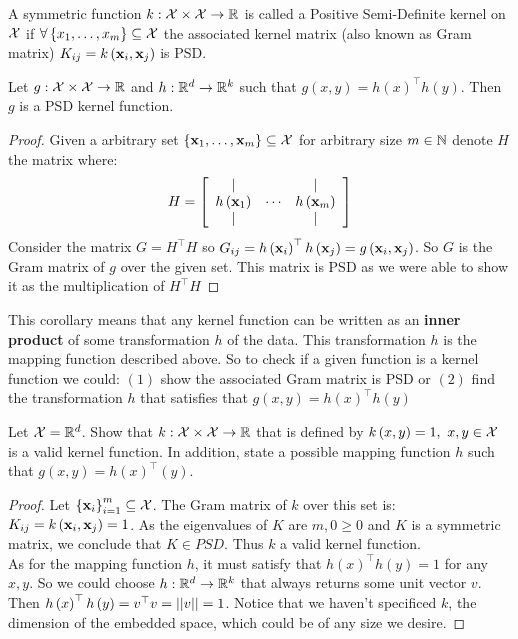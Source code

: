\begin{definition}
	A symmetric function $k:\mathcal{X}\times\mathcal{X}\rightarrow\mathbb{R}$ is called a Positive Semi-Definite kernel on $\mathcal{X}$ if $\forall \left\{x_1,\ldots,x_m\right\}\subseteq\mathcal{X}$ the associated kernel matrix (also known as Gram matrix) $K_{ij}=k\left(\mathbf{x}_i,\mathbf{x}_j\right)$ is PSD.
\end{definition}
\begin{corollary}
	Let $g:\mathcal{X}\times\mathcal{X}\rightarrow\mathbb{R}$ and $h:\mathbb{R}^d\rightarrow\mathbb{R}^k$ such that $g\left(x,y\right)=h\left(x\right)^\top h\left(y\right)$. Then $g$ is a PSD kernel function.
\end{corollary}
\begin{proof}
	Given a arbitrary set $\left\{\mathbf{x}_1,\ldots,\mathbf{x}_m\right\}\subseteq\mathcal{X}$ for arbitrary size $m\in\mathbb{N}$ denote $H$ the matrix where: $$ H=\left[\begin{array}{ccc}
		| & & |\\
		h\left(\mathbf{x}_1\right) & \cdots & h\left(\mathbf{x}_m\right)\\
		| & & |
	\end{array}\right] $$
	Consider the matrix $G=H^\top H$ so $G_{ij}=h\left(\mathbf{x}_i\right)^\top h\left(\mathbf{x}_j\right)=g\left(\mathbf{x}_i,\mathbf{x}_j\right)$. So $G$ is the Gram matrix of $g$ over the given set. This matrix is PSD as we were able to show it as the multiplication of $H^\top H$ 
\end{proof}

This corollary means that any kernel function can be written as an \textbf{inner product} of some transformation $h$ of the data. This transformation $h$ is the mapping function described above. So to check if a given function is a kernel function we could: $\left(1\right)$ show the associated Gram matrix is PSD or $\left(2\right)$ find the transformation $h$ that satisfies that $g\left(x,y\right)=h\left(x\right)^\top h\left(y\right)$~\\

\begin{exercise}
	Let $\mathcal{X}=\mathbb{R}^d$. Show that $k:\mathcal{X}\times\mathcal{X}\rightarrow \mathbb{R}$ that is defined by $k\left(x,y\right)=1,\,\,x,y\in\mathcal{X}$ is a valid kernel function. In addition, state a possible mapping function $h$ such that $g\left(x,y\right)=h\left(x\right)^\top \left(y\right)$.
\end{exercise}
\begin{proof}
	Let $\left\{\mathbf{x}_i\right\}^m_{i=1}\subseteq\mathcal{X}$. The Gram matrix of $k$ over this set is: $K_{ij}=k\left(\mathbf{x}_i,\mathbf{x}_j\right)=1$. As the eigenvalues of $K$ are $m,0\geq 0$ and $K$ is a symmetric matrix, we conclude that $K\in PSD$. Thus $k$ a valid kernel function.\\ As for the mapping function $h$, it must satisfy that $h\left(x\right)^\top h\left(y\right)=1$ for any $x,y$. So we could choose $h:\mathbb{R}^d\rightarrow\mathbb{R}^k$ that always returns some unit vector $v$. Then $h\left(x\right)^\top h\left(y\right) = v^\top v = \left|\left| v\right|\right| = 1$. Notice that we haven't specificed $k$, the dimension of the embedded space, which could be of any size we desire.
\end{proof}


